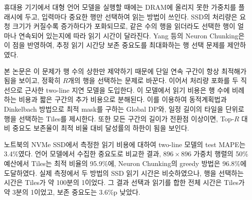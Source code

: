 \KoreanAbstractHeader

휴대용 기기에서 대형 언어 모델을 실행할 때에는 DRAM에 올리지 못한 가중치를 플래시에 두고, 입력마다 중요한 행만 선택하여 읽는 방법이 쓰인다. SSD의 처리량은 요청 크기가 커질수록 증가하다가 포화되므로, 같은 수의 행을 읽더라도 선택한 행이 얼마나 연속되어 있는지에 따라 읽기 시간이 달라진다. Yang 등의 Neuron Chunking은 이 점을 반영하여, 추정 읽기 시간당 보존 중요도를 최대화하는 행 선택 문제를 제안하였다.

본 논문은 이 문제가 행 수의 상한만 제약하기 때문에 단일 연속 구간이 항상 최적해가 됨을 보이고, 정확히 $R$개의 행을 선택하는 문제로 바꾼다. 이어서 처리량 포화를 두 직선으로 근사한 two-line 지연 모델을 도입한다. 이 모델에서 읽기 비용은 행 수에 비례하는 비용과 짧은 구간의 추가 비용으로 분해된다. 이를 이용하여 동적계획법과 Dinkelbach 방법으로 최적 mask를 구하는 Global DP와, 일정 길이의 타일을 단위로 행을 선택하는 Tiles를 제시한다. 또한 모든 구간의 길이가 전환점 이상이면, Top-$R$ 대비 중요도 보존율이 최적 비율 대비 달성률의 하한이 됨을 보인다.

노트북의 NVMe SSD에서 측정한 읽기 비용에 대하여 two-line 모델의 test MAPE는 3.4\%였다. 언어 모델에서 수집한 중요도로 비교한 결과, $896\times896$ 가중치 행렬의 50\% 예산에서 Tiles는 최적 비율의 95.9\%에, Neuron Chunking의 greedy 방법은 96.8\%에 도달하였다. 실제 측정에서 두 방법의 SSD 읽기 시간은 비슷하였으나, 행을 선택하는 시간은 Tiles가 약 100분의 1이었다. 그 결과 선택과 읽기를 합한 전체 시간은 Tiles가 약 3분의 1이었고, 보존 중요도는 3.6\%p 낮았다.

